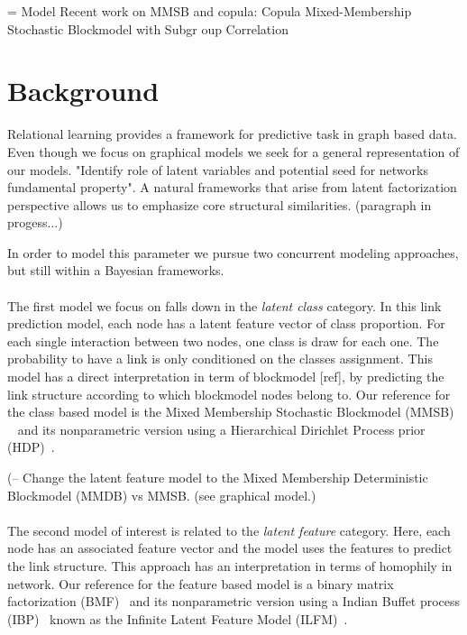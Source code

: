 \documentclass[a4paper, 12pt]{article}
\begin{document}
= Model
Recent work on MMSB and copula: Copula Mixed-Membership Stochastic Blockmodel with Subgr
oup Correlation


\section{Background}
Relational learning provides a framework for predictive task in graph based data.  Even though we focus on  graphical models we seek for a general representation of our models. "Identify role of latent variables and potential seed for networks fundamental property". A natural frameworks that arise from latent factorization perspective allows us to emphasize core structural similarities. (paragraph in progess...)

In order to model this parameter we pursue two concurrent modeling approaches, but still within a Bayesian frameworks.

\paragraph{}
The first model we focus on falls down in the \emph{latent class} category. In this link prediction model, each node has a latent feature vector of class proportion. For each single interaction between two nodes, one class is draw for each one. The probability to have a link is only conditioned on the classes assignment. This model has a direct interpretation in term of blockmodel [ref], by predicting the link structure according to which blockmodel nodes belong to. Our reference for the class based model is the Mixed Membership Stochastic Blockmodel (MMSB) ~\cite{MMSB} and its nonparametric version using a Hierarchical Dirichlet Process prior (HDP)~\cite{HDP}.

(-- Change the latent feature model to the Mixed Membership Deterministic Blockmodel (MMDB) vs MMSB. (see graphical model.)

\paragraph{}
The second model of interest is related to the \emph{latent feature} category. Here, each node has an associated feature vector and the model uses the features to predict the link structure. This approach has an interpretation in terms of homophily in network. Our reference for the feature based model is a binary matrix factorization  (BMF)~\cite{BMF} and its nonparametric version using a Indian Buffet process (IBP)~\cite{IBP} known as the Infinite Latent Feature Model (ILFM)~\cite{ILFRM}.
\end{document}
